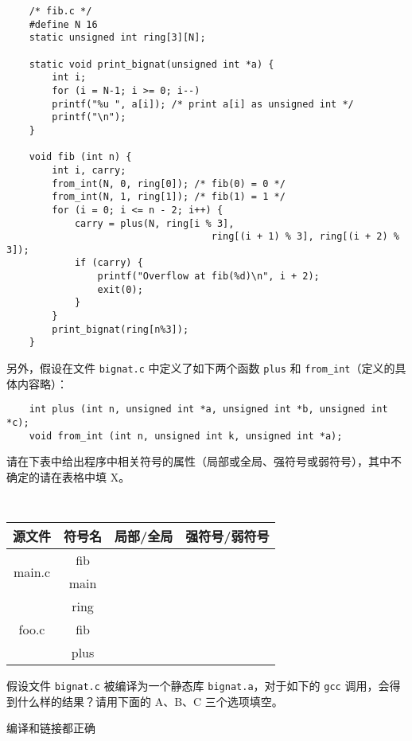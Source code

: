 \begin{problems}
\begin{verbatim}
    /* fib.c */
    #define N 16
    static unsigned int ring[3][N];

    static void print_bignat(unsigned int *a) {
        int i;
        for (i = N-1; i >= 0; i--)
        printf("%u ", a[i]); /* print a[i] as unsigned int */
        printf("\n");
    }

    void fib (int n) {
        int i, carry;
        from_int(N, 0, ring[0]); /* fib(0) = 0 */
        from_int(N, 1, ring[1]); /* fib(1) = 1 */
        for (i = 0; i <= n - 2; i++) {
            carry = plus(N, ring[i % 3],
                                    ring[(i + 1) % 3], ring[(i + 2) % 3]);
            if (carry) {
                printf("Overflow at fib(%d)\n", i + 2);
                exit(0);
            }
        }
        print_bignat(ring[n%3]);
    }
        \end{verbatim}
        另外，假设在文件 \verb|bignat.c| 中定义了如下两个函数 \verb|plus| 和 \verb|from_int|（定义的具体内容略）：
        \begin{verbatim}
    int plus (int n, unsigned int *a, unsigned int *b, unsigned int *c);
    void from_int (int n, unsigned int k, unsigned int *a);
        \end{verbatim}
        \qn 请在下表中给出程序中相关符号的属性（局部或全局、强符号或弱符号），其中不确定的请在表格中填 X。
        \begin{table}[H]
            \tt
            \centering
            \begin{tabular}{|c|c|c|c|}
                \hline
                源文件 & 符号名 & {\qquad \qquad 局部/全局 \qquad \qquad} & {\qquad \qquad 强符号/弱符号 \qquad \qquad} \\ \hline
                \multirow{2}{*}{main.c} & fib &  &  \\ \cline{2-4} 
                & main &  &  \\ \hline
                \multirow{3}{*}{foo.c} & ring &  &  \\ \cline{2-4} 
                & fib &  &  \\ \cline{2-4} 
                & plus &  &  \\ \hline
            \end{tabular}
        \end{table}
        \qn 假设文件 \verb|bignat.c| 被编译为一个静态库 \verb|bignat.a|，对于如下的 \verb|gcc| 调用，会得到什么样的结果？请用下面的 A、B、C 三个选项填空。
        \begin{choices}
            \item 编译和链接都正确

\end{choices}
\end{problems}
